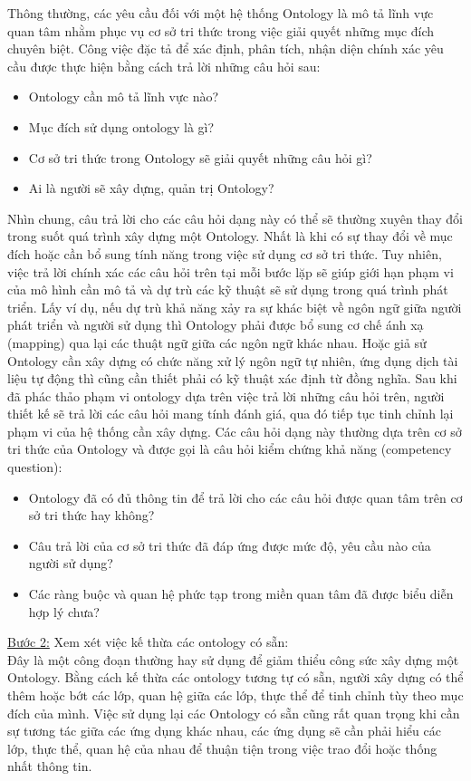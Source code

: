 Thông thường, các yêu cầu đối với một hệ thống Ontology là mô tả lĩnh vực quan tâm nhằm phục vụ cơ sở tri thức trong việc giải quyết những mục đích chuyên biệt. Công việc đặc tả để xác định, phân tích, nhận diện chính xác yêu cầu được thực hiện bằng cách trả lời những câu hỏi sau:
\begin{itemize}
	\item Ontology cần mô tả lĩnh vực nào?
	\item Mục đích sử dụng ontology là gì?
	\item Cơ sở tri thức trong Ontology sẽ giải quyết những câu hỏi gì?
	\item Ai là người sẽ xây dựng, quản trị Ontology?
\end{itemize}
Nhìn chung, câu trả lời cho các câu hỏi dạng này có thể sẽ thường xuyên thay đổi trong suốt quá trình xây dựng một Ontology. Nhất là khi có sự thay đổi về mục đích hoặc cần bổ sung tính năng trong việc sử dụng cơ sở tri thức. Tuy nhiên, việc trả lời chính xác các câu hỏi trên tại mỗi bước lặp sẽ giúp giới hạn phạm vi của mô hình cần mô tả và dự trù các kỹ thuật sẽ sử dụng trong quá trình phát triển. Lấy ví dụ, nếu dự trù khả năng xảy ra sự khác biệt về ngôn ngữ giữa người phát triển và người sử dụng thì Ontology phải được bổ sung cơ chế ánh xạ (mapping) qua lại các thuật ngữ giữa các ngôn ngữ khác nhau. Hoặc giả sử Ontology cần xây dựng có chức năng xử lý ngôn ngữ tự nhiên, ứng dụng dịch tài liệu tự động thì cũng cần thiết phải có kỹ thuật xác định từ đồng nghĩa. Sau khi đã phác thảo phạm vi ontology dựa trên việc trả lời những câu hỏi trên, người thiết kế sẽ trả lời các câu hỏi mang tính đánh giá, qua đó tiếp tục tinh chỉnh lại phạm vi của hệ thống cần xây dựng. Các câu hỏi dạng này thường dựa trên cơ sở tri thức của Ontology và được gọi là câu hỏi kiểm chứng khả năng (competency question):
\begin{itemize}
	\item Ontology đã có đủ thông tin để trả lời cho các câu hỏi được quan tâm trên cơ sở tri thức hay không?
	\item Câu trả lời của cơ sở tri thức đã đáp ứng được mức độ, yêu cầu nào của người sử dụng?
	\item Các ràng buộc và quan hệ phức tạp trong miền quan tâm đã được biểu diễn hợp lý chưa? 
\end{itemize}

\underline{Bước 2:} Xem xét việc kế thừa các ontology có sẵn: \\
Đây là một công đoạn thường hay sử dụng để giảm thiểu công sức xây dựng một Ontology. Bằng cách kế thừa các ontology tương tự có sẵn, người xây dựng có thể thêm hoặc bớt các lớp, quan hệ giữa các lớp, thực thể để tinh chỉnh tùy theo mục đích của mình. Việc sử dụng lại các Ontology có sẵn cũng rất quan trọng khi cần sự tương tác giữa các ứng dụng khác nhau, các ứng dụng sẽ cần phải hiểu các lớp, thực thể, quan hệ của nhau để thuận tiện trong việc trao đổi hoặc thống nhất thông tin.\\

